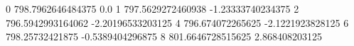 0 798.7962646484375 0.0
1 797.5629272460938 -1.23333740234375
2 796.5942993164062 -2.20196533203125
4 796.674072265625 -2.1221923828125
6 798.25732421875 -0.5389404296875
8 801.6646728515625 2.868408203125
